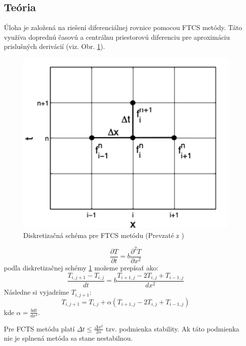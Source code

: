 \documentclass{article}
\theoremstyle{definition}
\theoremstyle{remark}
\begin{document}
\subsection{Teória}\label{sec:nothing}
Úloha je založená na riešení diferenciálnej rovnice pomocou FTCS metódy. Táto využíva doprednú časovú a centrálnu priestorovú diferenciu pre aproximáciu prislušných derivácií (viz. Obr. \ref{diskretizacia})\cite{Zukovic}. 
\begin{figure}
    \centering
    \includegraphics[width=1\textwidth]{ftcs.png}
    \caption{Diskretizačná schéma pre FTCS metódu (Prevzaté z \cite{Zukovic})}
    \label{diskretizacia}
\end{figure}


\begin{equation}
    \frac{\partial T}{\partial t} = b \frac{\partial^2 T}{\partial x^2}
\end{equation}
podľa diskretizačnej schémy \ref{diskretizacia} možeme prepísať ako:
\begin{equation}
\frac{T_{i,j+1}-T_{i,j}}{dt} = b \frac{T_{i+1,j}-2T_{i,j}+T_{i-1,j}}{dx^2}
\end{equation}
Následne si vyjadríme $T_{i,j+1}$:
\begin{equation}
    T_{i,j+1} = T_{i,j} + \alpha (T_{i+1,j} - 2T_{i,j} + T_{i-1,j})
\end{equation}
kde $\alpha = \frac{b dt}{dx^2}$. 


Pre FCTS metódu platí $\Delta t  \leq  \frac{\Delta x^2 }{2\alpha}$ tzv. podmienka stability. Ak táto podmienka nie je splnená metóda sa stane nestabilnou.\cite{wiki}
\end{document}
